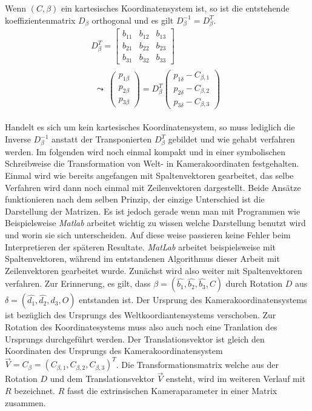 Wenn $(C,\beta)$ ein kartesisches Koordinatensystem ist, so ist die entstehende  koeffizientenmatrix $D_\beta$ orthogonal und es gilt \ensuremath{D_\beta^{-1} = D_\beta^T}. 
\begin{gather}
	D_\beta^{T} = 
	\begin{bmatrix}b_{11} & b_{12} & b_{13}\\
		b_{21} & b_{22} & b_{23}\\
		b_{31} & b_{32} & b_{33}
	\end{bmatrix} \\
	\begin{split}
		\leadsto \: \begin{pmatrix}
			p_{1\beta}\\p_{2\beta}\\ p_{3\beta}
		\end{pmatrix}
		= D_\beta^T 
		\begin{pmatrix}
			p_{1\delta} - C_{\beta,1}\\
			p_{2\delta} - C_{\beta,2}\\
			p_{3\delta} - C_{\beta,3}
		\end{pmatrix}
	\end{split} 
\end{gather}

Handelt es sich um kein kartesisches Koordinatensystem, so muss lediglich die Inverse \ensuremath{D_\beta^{-1}} anstatt der Transponierten \ensuremath{D_\beta^T} gebildet und wie gehabt verfahren werden. Im folgenden wird noch einmal kompakt und in einer symbolischen Schreibweise die Transformation von Welt- in Kamerakoordinaten  festgehalten. Einmal wird wie bereits angefangen mit Spaltenvektoren gearbeitet, das selbe Verfahren wird dann noch einmal mit Zeilenvektoren dargestellt.  Beide Ansätze funktionieren nach dem selben Prinzip, der einzige Unterschied ist die Darstellung der Matrizen. Es ist jedoch gerade wenn man mit Programmen wie Beispielsweise \textit{Matlab} arbeitet wichtig zu wissen welche Darstellung benutzt wird und worin sie sich unterscheiden. Auf diese weise passieren keine Fehler beim Interpretieren der späteren Resultate. \textit{MatLab} arbeitet beispielsweise mit Spaltenvektoren, während im entstandenen Algorithmus dieser Arbeit mit Zeilenvektoren gearbeitet wurde. Zunächst wird also weiter mit Spaltenvektoren verfahren. Zur Erinnerung, es gilt, dass $\beta = (\hat{b_1},\hat{b_2},\hat{b_3},C)$ durch Rotation $D$ aus $\delta = (\hat{d_1},\hat{d_2},\hat{d_3},O)$ entstanden ist. Der Ursprung des Kamerakoordinatensystems ist bezüglich des Ursprungs des Weltkoordiantensystems verschoben. Zur Rotation des Koordinatesystems muss also auch noch eine Tranlation des Ursprungs durchgeführt werden. Der Translationsvektor ist gleich den Koordinaten des Ursprungs des Kamerakoordinatensystem $\vec{V} = C_\beta = (C_{\beta,1}, C_{\beta,2}, C_{\beta,3})^T$. Die Transformationsmatrix welche aus der Rotation $D$ und dem Translationsvektor $\vec{V}$ ensteht, wird im weiteren Verlauf mit $R$ bezeichnet. $R$ fasst die extrinsischen Kameraparameter in einer Matrix zusammen.

